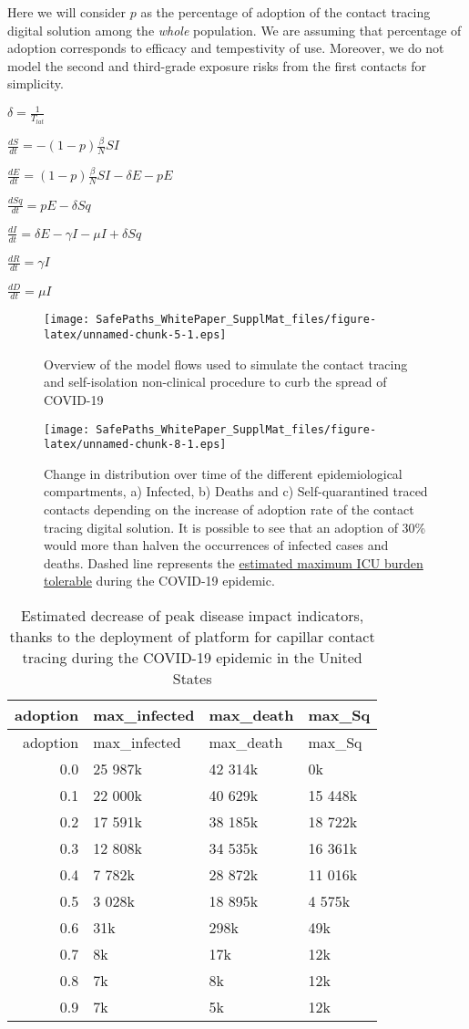 \documentclass[]{article}
\begin{document}
Here we will consider \(p\) as the percentage of adoption of the contact
tracing digital solution among the \emph{whole} population. We are
assuming that percentage of adoption corresponds to efficacy and
tempestivity of use. Moreover, we do not model the second and
third-grade exposure risks from the first contacts for simplicity.

\(\displaystyle \delta = \frac{1}{T_{lat}}\)

\(\displaystyle \frac{dS}{dt} = - (1-p)\frac{\beta}{N}SI\)

\(\displaystyle \frac{dE}{dt} = (1-p)\frac{\beta}{N}SI- \delta E - pE\)

\(\displaystyle \frac{dSq}{dt} = pE - \delta Sq\)

\(\displaystyle \frac{dI}{dt} = \delta E - \gamma I - \mu I + \delta Sq\)

\(\displaystyle \frac{dR}{dt} = \gamma I\)

\(\displaystyle \frac{dD}{dt} = \mu I\)

\begin{figure}
\centering
\texttt{[image: SafePaths\_WhitePaper\_SupplMat\_files/figure-latex/unnamed-chunk-5-1.eps]}
\caption{Overview of the model flows used to simulate the contact
tracing and self-isolation non-clinical procedure to curb the spread of
COVID-19}
\end{figure}

\begin{figure}
\centering
\texttt{[image: SafePaths\_WhitePaper\_SupplMat\_files/figure-latex/unnamed-chunk-8-1.eps]}
\caption{Change in distribution over time of the different
epidemiological compartments, a) Infected, b) Deaths and c)
Self-quarantined traced contacts depending on the increase of adoption
rate of the contact tracing digital solution. It is possible to see that
an adoption of 30\% would more than halven the occurrences of infected
cases and deaths. Dashed line represents the
\href{https://www.statnews.com/2020/03/10/simple-math-alarming-answers-covid-19/}{estimated
maximum ICU burden tolerable} during the COVID-19 epidemic.}
\end{figure}

\begin{longtable}[]{@{}rlll@{}}
\caption{Estimated decrease of peak disease impact indicators, thanks to
the deployment of platform for capillar contact tracing during the
COVID-19 epidemic in the United States}\tabularnewline
\toprule
adoption & max\_infected & max\_death & max\_Sq\tabularnewline
\midrule
\endfirsthead
\toprule
adoption & max\_infected & max\_death & max\_Sq\tabularnewline
\midrule
\endhead
0.0 & 25 987k & 42 314k & 0k\tabularnewline
0.1 & 22 000k & 40 629k & 15 448k\tabularnewline
0.2 & 17 591k & 38 185k & 18 722k\tabularnewline
0.3 & 12 808k & 34 535k & 16 361k\tabularnewline
0.4 & 7 782k & 28 872k & 11 016k\tabularnewline
0.5 & 3 028k & 18 895k & 4 575k\tabularnewline
0.6 & 31k & 298k & 49k\tabularnewline
0.7 & 8k & 17k & 12k\tabularnewline
0.8 & 7k & 8k & 12k\tabularnewline
0.9 & 7k & 5k & 12k\tabularnewline
\bottomrule
\end{longtable}
\end{document}
